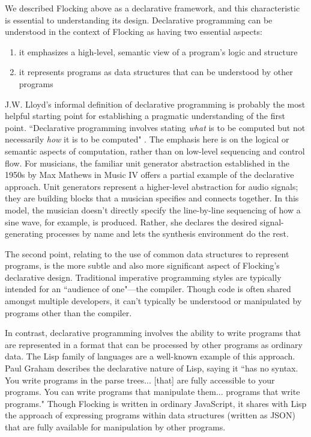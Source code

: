 \documentclass{article}
\begin{document}
We described Flocking above as a declarative framework, and this characteristic is essential to understanding its design. Declarative programming can be understood in the context of Flocking as having two essential aspects:

\begin{enumerate}
\item it emphasizes a high-level, semantic view of a program’s logic and structure
\item it represents programs as data structures that can be understood by other programs
\end{enumerate}

J.W. Lloyd's informal definition of declarative programming is probably the most helpful starting point for establishing a pragmatic understanding of the first point. ``Declarative programming involves stating {\it what} is to be computed but not necessarily {\it how} it is to be computed" \cite{lloyd1994practical}. The emphasis here is on the logical or semantic aspects of computation, rather than on low-level sequencing and control flow. For musicians, the familiar unit generator abstraction established in the 1950s by Max Mathews in Music IV \cite{mathews1969technology} offers a partial example of the declarative approach. Unit generators represent a higher-level abstraction for audio signals; they are building blocks that a musician specifies and connects together. In this model, the musician doesn't directly specify the line-by-line sequencing of how a sine wave, for example, is produced. Rather, she declares the desired signal-generating processes by name and lets the synthesis environment do the rest.

The second point, relating to the use of common data structures to represent programs, is the more subtle and also more significant aspect of Flocking’s declarative design. Traditional imperative programming styles are typically intended for an ``audience of one"---the compiler. Though code is often shared amongst multiple developers, it can’t typically be understood or manipulated by programs other than the compiler.

In contrast, declarative programming involves the ability to write programs that are represented in a format that can be processed by other programs as ordinary data. The Lisp family of languages are a well-known example of this approach. Paul Graham describes the declarative nature of Lisp, saying it ``has no syntax. You write programs in the parse trees... [that] are fully accessible to your programs. You can write programs that manipulate them... programs that write programs." Though Flocking is written in ordinary JavaScript, it shares with Lisp the approach of expressing programs within data structures (written as JSON) that are fully available for manipulation by other programs.
\end{document}
